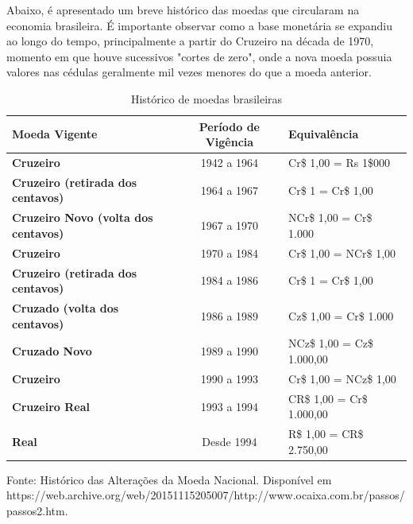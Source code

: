 \documentclass[12pt,oneside,a4paper,chapter=TITLE,english,brazil,sumario=abnt-6027-2012]{abntex2}
\begin{document}
Abaixo, é apresentado um breve histórico das moedas que circularam na economia brasileira. É importante observar como a base monetária se expandiu ao longo do tempo, principalmente a partir do Cruzeiro na década de 1970, momento em que houve sucessivos "cortes de zero", onde a nova moeda possuia valores nas cédulas geralmente mil vezes menores do que a moeda anterior.

\vspace{0.2cm}

\begin{table}[H]
	\caption{Histórico de moedas brasileiras}
	\begin{tabular}{ | l || c | l | }
		\hline
		\textbf{Moeda Vigente}                      & \textbf{Período de Vigência} & \textbf{Equivalência}      \\
		\hline
		\textbf{Cruzeiro}                           & 1942 a 1964                  & Cr\$ 1,00 = Rs 1\$000      \\
		\textbf{Cruzeiro (retirada dos centavos)}   & 1964 a 1967                  & Cr\$ 1 = Cr\$ 1,00         \\
		\textbf{Cruzeiro Novo (volta dos centavos)} & 1967 a 1970                  & NCr\$ 1,00 = Cr\$ 1.000    \\
		\textbf{Cruzeiro}                           & 1970 a 1984                  & Cr\$ 1,00 = NCr\$ 1,00     \\
		\textbf{Cruzeiro (retirada dos centavos)}   & 1984 a 1986                  & Cr\$ 1 = Cr\$ 1,00         \\
		\textbf{Cruzado (volta dos centavos)}       & 1986 a 1989                  & Cz\$ 1,00 = Cr\$ 1.000     \\
		\textbf{Cruzado Novo}                       & 1989 a 1990                  & NCz\$ 1,00 = Cz\$ 1.000,00 \\
		\textbf{Cruzeiro}                           & 1990 a 1993                  & Cr\$ 1,00 = NCz\$ 1,00     \\
		\textbf{Cruzeiro Real}                      & 1993 a 1994                  & CR\$ 1,00 = Cr\$ 1.000,00  \\
		\textbf{Real}                               & Desde 1994                   & R\$ 1,00 = CR\$ 2.750,00   \\                                                                  
		\hline
	\end{tabular}
	\vspace{1ex}
	
	\noindent \footnotesize{Fonte: Histórico das Alterações da Moeda Nacional. Disponível em \\ https://web.archive.org/web/20151115205007/http://www.ocaixa.com.br/passos/passos2.htm.}
\end{table}
\vspace{-0.2cm}
\vspace{0.5cm}
\end{document}
